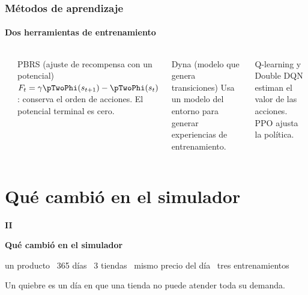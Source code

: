 \documentclass[aspectratio=169,10pt]{beamer}
\begin{document}
\begin{frame}
\frametitle{M\'etodos de aprendizaje}
\framesubtitle{Dos herramientas de entrenamiento}
\begin{columns}[T,onlytextwidth]
\begin{center}
\end{center}
\begin{block}{PBRS \normalfont\scriptsize\color{p2muted} (ajuste de recompensa con un potencial)}
\scriptsize $F_t = \gamma\pTwoPhi(s_{t+1}) - \pTwoPhi(s_t)$: conserva el orden de acciones. El potencial terminal es cero.
\end{block}
\vspace{0.15cm}
\begin{block}{Dyna \normalfont\scriptsize\color{p2muted} (modelo que genera transiciones)}
\scriptsize Usa un modelo del entorno para generar experiencias de entrenamiento.
\end{block}
\vspace{0.15cm}
{\scriptsize\color{p2muted} Q-learning y Double DQN estiman el valor de las acciones. PPO ajusta la pol\'itica.\par}
\end{columns}
\end{frame}

\section{Qu\'e cambi\'o en el simulador}

\begin{frame}[plain]
\vspace{0.9cm}
{\fontsize{52}{52}\selectfont\bfseries\color{p2amber} II\par}
\vspace{0.1cm}
{\fontsize{24}{26}\selectfont\bfseries Qu\'e cambi\'o en el simulador\par}
\vspace{0.15cm}
\par
\vspace{0.25cm}
{\small\color{p2muted} un producto \textperiodcentered\ 365 d\'ias \textperiodcentered\ 3 tiendas \textperiodcentered\ mismo precio del d\'ia \textperiodcentered\ tres entrenamientos\par}
\vspace{0.15cm}
{\small\color{p2ink} Un quiebre es un d\'ia en que una tienda no puede atender toda su demanda.\par}
\end{frame}
\end{document}
